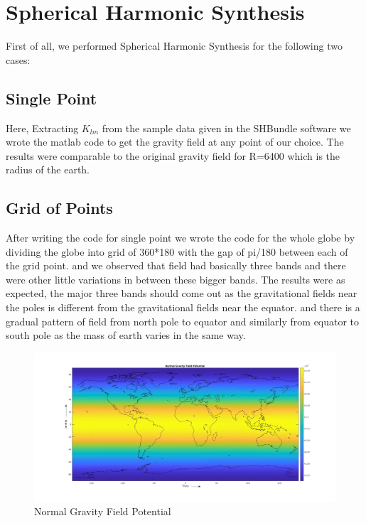 \documentclass[a4paper,12pt]{report}
\begin{document}
\chapter{Spherical Harmonic Synthesis}
First of all, we performed Spherical Harmonic Synthesis for the following two cases:
\section{Single Point}
Here, Extracting $K_{lm}$ from the sample data given in the SHBundle software we wrote the matlab code to get the gravity field at any point of our choice.
The results were comparable to the original gravity field for R=6400 which is the radius of the earth.

\section{Grid of Points}

After writing the code for single point we wrote the code for the whole globe by dividing the globe into grid of 360*180 with the gap of pi/180 between each of the grid point.
and we observed that field had basically three bands and there were other little variations in between these bigger bands. The results were as expected, the major three bands should come out as the gravitational fields near the poles is different from the gravitational fields near the equator. and there is a gradual pattern of field from north pole to equator and similarly from equator to south pole as the mass of earth varies in the same way.\\

\begin{figure}[!h]
    \centering
    \includegraphics[width=0.96\linewidth]{Normal_grid}
    \caption{Normal Gravity Field Potential}
    
\end{figure}
\end{document}
